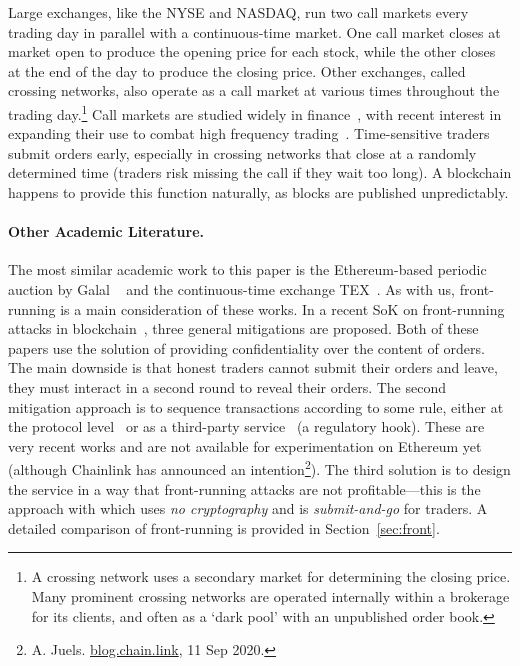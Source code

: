 Large exchanges, like the NYSE and NASDAQ, run two call markets every trading day in parallel with a continuous-time market. One call market closes at market open to produce the opening price for each stock, while the other closes at the end of the day to produce the closing price. Other exchanges, called crossing networks, also operate as a call market at various times throughout the trading day.\footnote{A crossing network uses a secondary market for determining the closing price. Many prominent crossing networks are operated internally within a brokerage for its clients, and often as a `dark pool' with an unpublished order book.} Call markets are studied widely in finance~\cite{Har03}, with recent interest in expanding their use to combat high frequency trading~\cite{budish2015high,aquilina2020quantifying}. Time-sensitive traders submit orders early, especially in crossing networks that close at a randomly determined time (traders risk missing the call if they wait too long). A blockchain happens to provide this function naturally, as blocks are published unpredictably. %

\paragraph{Other Academic Literature.}

The most similar academic work to this paper is the Ethereum-based periodic auction by Galal \etal~\cite{galalpublicly} and the continuous-time exchange TEX~\cite{khalil2019tex}. As with us, front-running is a main consideration of these works. In a recent SoK on front-running attacks in blockchain~\cite{eskandari2019sok}, three general mitigations are proposed. Both of these papers use the solution of providing confidentiality over the content of orders. The main downside is that honest traders cannot submit their orders and leave, they must interact in a second round to reveal their orders. The second mitigation approach is to sequence transactions according to some rule, either at the protocol level~\cite{kelkar2020order} or as a third-party service~\cite{Kla20} (a regulatory hook). These are very recent works and are not available for experimentation on Ethereum yet (although Chainlink has announced an intention\footnote{A. Juels. \href{https://blog.chain.link/chainlink-fair-sequencing-services-enabling-a-provably-fair-defi-ecosystem/}{blog.chain.link}, 11 Sep 2020.}). The third solution is to design the service in a way that front-running attacks are not profitable---this is the approach with \cm which uses \textit{no cryptography} and is \textit{submit-and-go} for traders. A detailed comparison of front-running is provided in Section~\ref{sec:front}.

